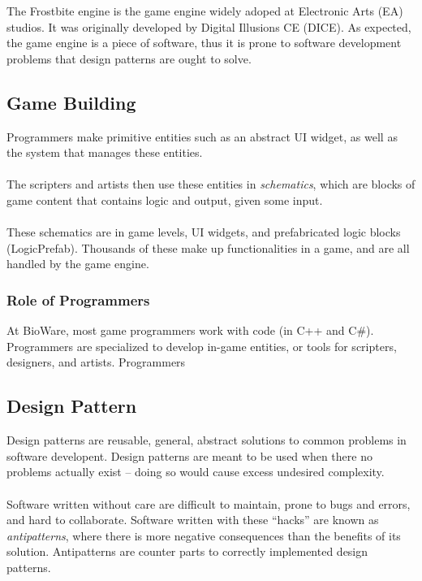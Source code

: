 \documentclass[10pt,letterpaper]{article}
\begin{document}
\begin{multicols}{2}
The Frostbite engine is the game engine widely adoped at Electronic Arts (EA) studios. It was originally developed by Digital Illusions CE (DICE).\cite{frostbite}\cite{frostbite-wiki} As expected, the game engine is a piece of software, thus it is prone to software development problems that design patterns are ought to solve.

\subsection{Game Building}

Programmers make primitive entities such as an abstract UI widget, as well as the system that manages these entities.\\
\\
The scripters and artists then use these entities in \textit{schematics}, which are blocks of game content that contains logic and output, given some input.\\
\\
These schematics are in game levels, UI widgets, and prefabricated logic blocks (LogicPrefab). Thousands of these make up functionalities in a game, and are all handled by the game engine.


\subsubsection{Role of Programmers}

At BioWare, most game programmers work with code (in C++ and C\#). Programmers are specialized to develop in-game entities, or tools for scripters, designers, and artists. Programmers 


\subsection{Design Pattern}

Design patterns are reusable, general, abstract solutions to common problems in software developent. Design patterns are meant to be used when there no problems actually exist -- doing so would cause excess undesired complexity.\\
\\
Software written without care are difficult to maintain, prone to bugs and errors, and hard to collaborate. Software written with these ``hacks'' are known as \textit{antipatterns}, where there is more negative consequences than the benefits of its solution. Antipatterns are counter parts to correctly implemented design patterns.


\end{multicols}
\end{document}
